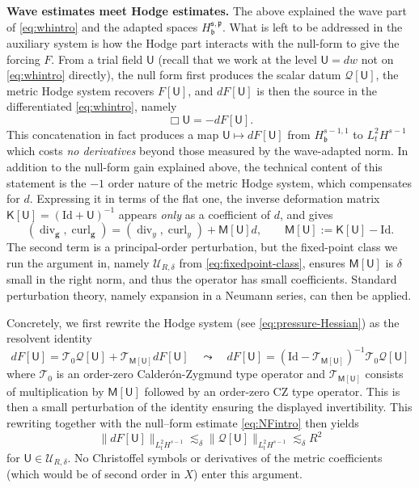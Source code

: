 \documentclass[11pt,reqno]{amsart}
\theoremstyle{plain}
\theoremstyle{definition}
\theoremstyle{remark}
\numberwithin{equation}{section}
\DeclareMathOperator{\Div}{div}
\DeclareMathOperator{\curl}{curl}
\newcommand{\breg}{\mathfrak b}
\newcommand{\sreg}{\mathfrak s}
\newcommand{\preg}{\mathfrak p}
\newcommand{\Ufield}{\mathsf U}
\newcommand{\Kmat}{\mathsf K}
\newcommand{\Mmat}{\mathsf M}
\newcommand{\gmetric}{\mathbf g}
\begin{document}
\textbf{Wave estimates meet Hodge estimates.}  The above explained the wave part of \eqref{eq:whintro} and the adapted spaces $H_{\breg}^{\sreg,\preg}$. What is left to be addressed in the auxiliary system is how the Hodge part interacts with the null-form to give the forcing $F$.  From a trial field
$\Ufield$ (recall that we work at the level $\Ufield=d w$ not on \eqref{eq:whintro} directly), the null form first produces the scalar datum
$\mathcal Q[\Ufield]$,  the metric Hodge system recovers $F[\Ufield]$, and
$dF[\Ufield]$ is then the source in the differentiated \eqref{eq:whintro}, namely
\[
 \Box\Ufield=-dF[\Ufield].
\]
This concatenation in fact produces a map $\Ufield\mapsto dF[\Ufield]$ from
$H^{s-1,1}_{\breg}$ to $L^2_tH^{s-1}$ which costs \textit{no derivatives} beyond those
measured by the wave-adapted norm. In addition to the null-form gain explained above, the technical content of this statement is the $-1$ order nature of the metric Hodge system, which compensates for $d$. Expressing it in terms of the flat one, the inverse deformation matrix $\Kmat[\Ufield]=(\mathrm{Id}+\Ufield)^{-1}$ appears \emph{only} as a coefficient of $d$, and gives
\[
 (\Div_{\gmetric},\curl_{\gmetric})
 = (\Div_y,\curl_y)
   +\Mmat[\Ufield]d, \qquad
 \Mmat[\Ufield]:=\Kmat[\Ufield]-\mathrm{Id}.
\]
The second term is a principal-order perturbation, but the fixed-point class we run the argument in, namely $\mathcal{U}_{R,\delta}$ from \eqref{eq:fixedpoint-class}, ensures $\Mmat[\Ufield]$ is $\delta$ small in the right norm, and thus the operator has small coefficients. Standard perturbation theory, namely expansion in a Neumann series, can then be applied. 

Concretely, we first rewrite the Hodge system (see \eqref{eq:pressure-Hessian}) as the resolvent identity
\begin{equation}\label{eq:resolventintro}
    dF[\Ufield]
 =
 \mathscr T_0\mathcal Q[\Ufield]
 +\mathscr T_{\Mmat[\Ufield]}dF[\Ufield] \quad\leadsto \quad dF[\Ufield]=(\mathrm{Id}-\mathscr T_{\Mmat[\Ufield]})^{-1}\mathscr T_0\mathcal Q[\Ufield]
\end{equation}
where $\mathscr T_0$ is an order-zero Calderón-Zygmund type operator and
$\mathscr T_{\Mmat[\Ufield]}$ consists of multiplication by
$\Mmat[\Ufield]$ followed by an order-zero CZ type operator. This is then a small perturbation of the identity ensuring the displayed invertibility.  This rewriting together with the null--form estimate \eqref{eq:NFintro} then yields
\begin{equation}\label{eq:hessianintro}
    \|dF[\Ufield]\|_{L^2_tH^{s-1}}
 \lesssim_\delta
 \|\mathcal Q[\Ufield]\|_{L^2_tH^{s-1}}
 \lesssim_\delta R^2
\end{equation}
for $\Ufield\in \mathcal{U}_{R,\delta}$. No Christoffel symbols or derivatives of the metric coefficients (which would be of second order in $X$) enter this argument.
\end{document}
